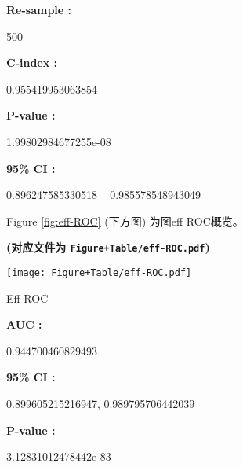 \documentclass[
]{article}
\begin{document}
\begin{center}\begin{tcolorbox}[colback=gray!10, colframe=gray!50, width=0.9\linewidth, arc=1mm, boxrule=0.5pt]
\textbf{
Re-sample
:}

\vspace{0.5em}

    500

\vspace{2em}


\textbf{
C-index
:}

\vspace{0.5em}

    0.955419953063854

\vspace{2em}


\textbf{
P-value
:}

\vspace{0.5em}

    1.99802984677255e-08

\vspace{2em}


\textbf{
95\% CI
:}

\vspace{0.5em}

    0.896247585330518 ~ 0.985578548943049

\vspace{2em}
\end{tcolorbox}
\end{center}

Figure \ref{fig:eff-ROC} (下方图) 为图eff ROC概览。

\textbf{(对应文件为 \texttt{Figure+Table/eff-ROC.pdf})}

\def\@captype{figure}
\begin{center}
\texttt{[image: Figure+Table/eff-ROC.pdf]}
\caption{Eff ROC}\label{fig:eff-ROC}
\end{center}

\begin{center}\begin{tcolorbox}[colback=gray!10, colframe=gray!50, width=0.9\linewidth, arc=1mm, boxrule=0.5pt]
\textbf{
AUC
:}

\vspace{0.5em}

    0.944700460829493

\vspace{2em}


\textbf{
95\% CI
:}

\vspace{0.5em}

    0.899605215216947, 0.989795706442039

\vspace{2em}


\textbf{
P-value
:}

\vspace{0.5em}

    3.12831012478442e-83

\vspace{2em}
\end{tcolorbox}
\end{center}
\end{document}
